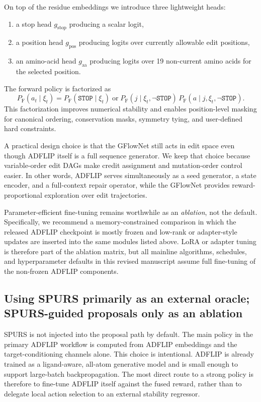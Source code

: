 \documentclass[11pt]{article}
\newcommand{\PF}{\ensuremath{P_{\mathrm F}}}
\begin{document}
On top of the residue embeddings we introduce three lightweight heads:
\begin{enumerate}[leftmargin=1.5em]
    \item a stop head $g_{\mathrm{stop}}$ producing a scalar logit,
    \item a position head $g_{\mathrm{pos}}$ producing logits over currently allowable edit positions,
    \item an amino-acid head $g_{\mathrm{aa}}$ producing logits over 19 non-current amino acids for the selected position.
\end{enumerate}
The forward policy is factorized as
\begin{equation}
\label{eq:forwardfactorized}
    \PF(a_t\mid \xi_t)=\PF(\mathtt{STOP}\mid\xi_t)\;\text{or}\;\PF(j\mid \xi_t,\neg\mathtt{STOP})\,\PF(a\mid j,\xi_t,\neg\mathtt{STOP}).
\end{equation}
This factorization improves numerical stability and enables position-level masking for canonical ordering, conservation masks, symmetry tying, and user-defined hard constraints.

A practical design choice is that the GFlowNet still acts in edit space even though ADFLIP itself is a full sequence generator. We keep that choice because variable-order edit DAGs make credit assignment and mutation-order control easier. In other words, ADFLIP serves simultaneously as a seed generator, a state encoder, and a full-context repair operator, while the GFlowNet provides reward-proportional exploration over edit trajectories.

Parameter-efficient fine-tuning remains worthwhile as an \emph{ablation}, not the default. Specifically, we recommend a memory-constrained comparison in which the released ADFLIP checkpoint is mostly frozen and low-rank or adapter-style updates are inserted into the same modules listed above. LoRA or adapter tuning is therefore part of the ablation matrix, but all mainline algorithms, schedules, and hyperparameter defaults in this revised manuscript assume full fine-tuning of the non-frozen ADFLIP components.



\subsection{Using SPURS primarily as an external oracle; SPURS-guided proposals only as an ablation}

SPURS is not injected into the proposal path by default. The main policy in the primary ADFLIP workflow is computed from ADFLIP embeddings and the target-conditioning channels alone. This choice is intentional. ADFLIP is already trained as a ligand-aware, all-atom generative model and is small enough to support large-batch backpropagation. The most direct route to a strong policy is therefore to fine-tune ADFLIP itself against the fused reward, rather than to delegate local action selection to an external stability regressor.
\end{document}
